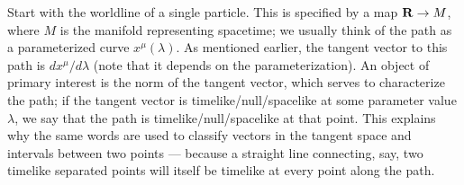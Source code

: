 Start with the worldline of a single particle.  This is specified
by a map ${\bf R} \rightarrow M$, where $M$ is the manifold representing
spacetime; we usually think of the path as a parameterized curve
$x^\mu(\lambda)$.  As mentioned earlier, the tangent vector to this
path is $dx^\mu/d\lambda$ (note that it depends on the parameterization).  
An object of primary interest is the norm
of the tangent vector, which serves to characterize the path; if the
tangent vector is timelike/null/spacelike at some parameter value
$\lambda$, we say that the path is timelike/null/spacelike at that
point.  This explains why the same words are used to classify vectors
in the tangent space and intervals between two points --- because a
straight line connecting, say, two timelike separated points will 
itself be timelike at every point along the path.

\begin{figure}
  \centerline{
  }
\end{figure}

